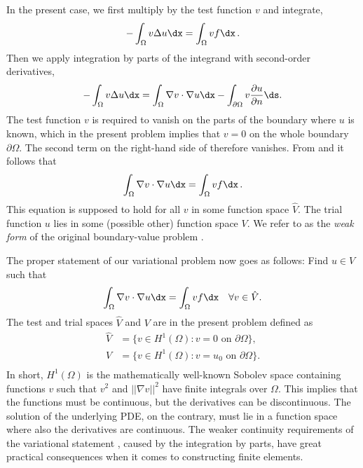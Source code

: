 In the present case, we first multiply by the test function $v$ and integrate,
\begin{equation}
\label{langtangen:poisson1:multbyv}
 -\int_\Omega v\Delta u \dx = \int_\Omega vf\dx\langtangenep\end{equation}
Then we apply integration by parts of the integrand with
second-order derivatives,
\begin{equation}
\label{langtangen:poisson1:eqbyparts}
 -\int_\Omega v\Delta u \dx
= \int_\Omega\nabla v\cdot\nabla u\dx - \int_{\partial\Omega}v{\partial u\over
\partial n}\ds .\end{equation}
The test function $v$ is required to vanish on the parts of the
boundary where $u$ is known, which in the present problem implies that
$v=0$ on the whole boundary $\partial\Omega$.
The second term on
the right-hand side of  therefore vanishes. 
From  and 
it follows that
\begin{equation} \int_\Omega\nabla v\cdot\nabla u\dx = \int_\Omega vf\dx\langtangenep
\label{langtangen:poisson1:weak1}
\end{equation}
This equation is supposed to hold
for all $v$ in some function space $\hat V$. The trial function $u$
lies in some (possible other) function space $V$.
We refer to  as the \emph{weak form} of
the original boundary-value problem .

The proper statement of
our variational problem now goes as follows: 
Find $u \in V$ such that
\begin{equation} \label{langtangen:poisson1:var}
  \int_{\Omega} \nabla v \cdot \nabla u \dx =
  \int_{\Omega} v f \dx
  \quad \forall v \in \hat{V}.
\end{equation}
The test and trial spaces $\hat{V}$ and $V$ are in the present
problem defined as
\begin{displaymath}
  \begin{split}
    \hat{V} &= \{v \in H^1(\Omega) : v = 0 \mbox{ on } \partial\Omega\}, \\
     V      &= \{v \in H^1(\Omega) : v = u_0 \mbox{ on } \partial\Omega\}. \\
  \end{split}
\end{displaymath}
In short, 
$H^1(\Omega)$ is the mathematically well-known Sobolev space containing
functions $v$ such that $v^2$ and $||\nabla v||^2$ have finite integrals over
$\Omega$. This implies that the functions must be continuous, but the
derivatives can be discontinuous. The solution of the underlying
PDE, on the contrary, 
must lie in a function space where also the derivatives are continuous.
The weaker continuity requirements of the variational statement
, caused by the integration by parts, have
great practical consequences when it comes to constructing
finite elements.

